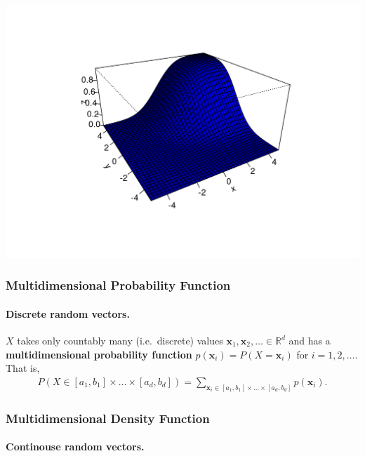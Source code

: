 \documentclass[
  14pt,
]{memoir}
\begin{document}
\begin{center}\includegraphics[width=0.8\linewidth]{figure/minimal-unnamed-chunk-37-1} \end{center}

\hypertarget{multidimensional-probability-function}{%
\subsubsection{Multidimensional Probability Function}\label{multidimensional-probability-function}}

\paragraph*{Discrete random vectors.}

\(X\) takes only countably many (i.e.~discrete) values \(\mathbf{x}_1,\mathbf{x}_2,\dots\in\mathbb{R}^d\) and has a \textbf{multidimensional probability function} \(p(\mathbf{x}_i)=P(X=\mathbf{x}_i)\) for \(i=1,2,\dots\). That is,
\begin{align*}
P(X\in [a_1,b_1]\times\dots\times [a_d,b_d])=
\sum_{\mathbf{x}_i\in [a_1,b_1]\times\dots\times [a_d,b_d]}p(\mathbf{x}_i).
\end{align*}

\hypertarget{multidimensional-density-function}{%
\subsubsection{Multidimensional Density Function}\label{multidimensional-density-function}}

\paragraph*{Continouse random vectors.}
\end{document}
